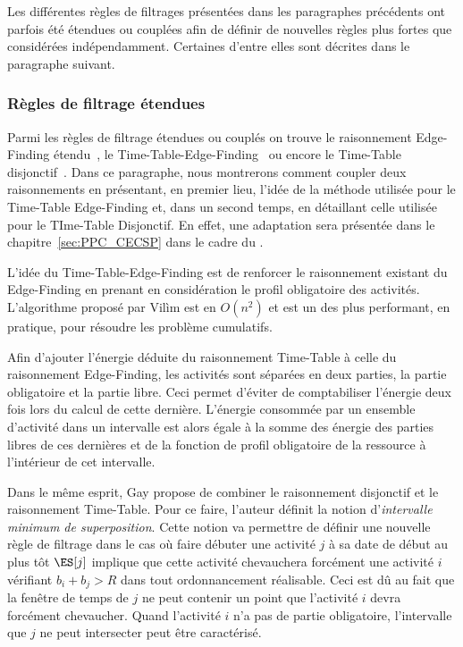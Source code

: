 Les différentes règles de filtrages présentées dans les paragraphes
précédents ont parfois été étendues ou couplées afin de définir de
nouvelles règles plus fortes que considérées indépendamment. Certaines
d'entre elles sont décrites dans le paragraphe suivant. 


\subsubsection{Règles de filtrage étendues}
\label{sec:mix_CUSP}

Parmi les règles de filtrage étendues ou couplés on trouve le
raisonnement Edge-Finding étendu~\cite{ExtEF}, le
Time-Table-Edge-Finding~\cite{V11} ou encore le Time-Table
disjonctif~\cite{Gay2015}. Dans ce paragraphe, nous montrerons comment
coupler deux raisonnements en présentant, en premier lieu, l'idée de
la méthode utilisée pour le Time-Table Edge-Finding et, dans un second
temps, en détaillant celle utilisée pour le TIme-Table Disjonctif. En
effet, une adaptation sera présentée dans le
chapitre~\ref{sec:PPC_CECSP} dans le cadre du \CECSP.

L'idée du Time-Table-Edge-Finding est de renforcer le raisonnement
existant du Edge-Finding en prenant en considération le profil
obligatoire des activités. L'algorithme proposé par Vil{\`i}m est en
$O(n^2)$ et est un des plus performant, en pratique, pour résoudre les
problème cumulatifs. 

Afin d'ajouter l'énergie déduite du raisonnement Time-Table à celle du
raisonnement Edge-Finding, les activités sont séparées en deux
parties, la partie obligatoire et la partie libre. Ceci permet
d'éviter de comptabiliser l'énergie deux fois lors du calcul de cette
dernière. L'énergie consommée par un ensemble d'activité dans un
intervalle est alors égale à la somme des énergie des parties libres
de ces dernières et de la fonction de profil obligatoire de la
ressource à l'intérieur de cet intervalle. 

Dans le même esprit, Gay propose de combiner le raisonnement
disjonctif et le raisonnement Time-Table. Pour ce faire, l'auteur
définit la notion d'{\it intervalle minimum de superposition}. Cette
notion va permettre de définir une nouvelle règle de filtrage dans le
cas où faire débuter une activité $j$ à sa date de début au plus tôt
$\ES[j]$ implique que cette activité chevauchera forcément une
activité $i$ vérifiant $b_i+b_j > R$ dans tout ordonnancement
réalisable. Ceci est dû au fait que la fenêtre de temps de $j$ ne peut
contenir un point que l'activité $i$ devra forcément chevaucher. Quand
l'activité $i$ n'a pas de partie obligatoire, l'intervalle que $j$ ne
peut intersecter peut être caractérisé. 

